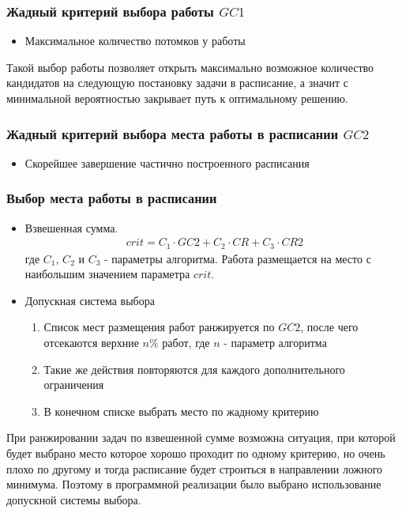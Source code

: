 \subsubsection*{Жадный критерий выбора работы $GC1$}
\begin{itemize}
    \item Максимальное количество потомков у работы
\end{itemize}
Такой выбор работы позволяет открыть максимально возможное количество кандидатов на следующую постановку задачи в расписание, а значит с минимальной вероятностью закрывает путь к оптимальному решению.
\subsubsection*{Жадный критерий выбора места работы в расписании $GC2$}
\begin{itemize}
    \item Скорейшее завершение частично построенного расписания
\end{itemize}
\subsubsection*{Выбор места работы в расписании}
\begin{itemize}
    \item Взвешенная сумма.
          \begin{gather*}
              crit = C_1 \cdot GC2 + C_2 \cdot CR + C_3 \cdot CR2
          \end{gather*}
          где $C_1$, $C_2$ и $C_3$ - параметры алгоритма. Работа размещается на место с наибольшим значением параметра $crit$.
    \item Допускная система выбора
          \begin{enumerate}
              \item Список мест размещения работ ранжируется по $GC2$, после чего отсекаются верхние $n\%$ работ, где $n$ - параметр алгоритма
              \item Такие же действия повторяются для каждого дополнительного ограничения
              \item В конечном списке выбрать место по жадному критерию
          \end{enumerate}
\end{itemize}
При ранжировании задач по взвешенной сумме возможна ситуация, при которой будет выбрано место которое хорошо проходит по одному критерию, но очень плохо по другому и тогда расписание будет строиться в направлении ложного минимума. Поэтому в программной реализации было выбрано использование допускной системы выбора.
